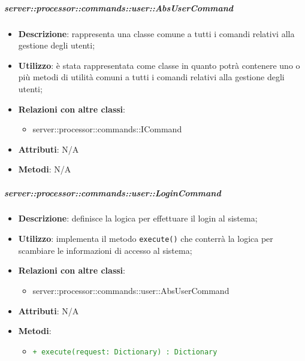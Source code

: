         \subparagraph{server::processor::commands::user::AbsUserCommand} %
        \label{subp:bdsm_app_server_processor_commands_user_absusercommand}
        \begin{itemize}
          \item \textbf{Descrizione}: rappresenta una classe comune a tutti i comandi relativi alla gestione degli utenti;
          \item \textbf{Utilizzo}: è stata rappresentata come classe in quanto potrà contenere uno o più metodi di utilità comuni a tutti i comandi relativi alla gestione degli utenti;
          \item \textbf{Relazioni con altre classi}:
            \begin{itemize}
              \item server::processor::commands::ICommand
            \end{itemize}
      \item \textbf{Attributi}: N/A
      \item \textbf{Metodi}: N/A
        \end{itemize}

        \subparagraph{server::processor::commands::user::LoginCommand} %
        \label{subp:bdsm_app_server_processor_commands_user_LoginCommand}
        \begin{itemize}
          \item \textbf{Descrizione}: definisce la logica per effettuare il login al sistema;
          \item \textbf{Utilizzo}: implementa il metodo \texttt{execute()} che conterrà la logica per scambiare le informazioni di accesso al sistema;
          \item \textbf{Relazioni con altre classi}:
            \begin{itemize}
              \item server::processor::commands::user::AbsUserCommand
            \end{itemize}
          \item \textbf{Attributi}: N/A
          \item \textbf{Metodi}:
          \begin{itemize}
              \item \textcolor{forestgreen}{\texttt{+ execute(request: Dictionary) : Dictionary}}
          \end{itemize}
        \end{itemize}

